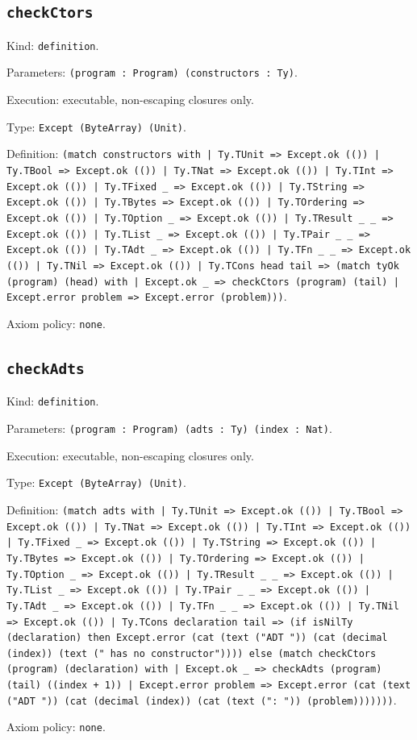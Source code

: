 \documentclass[11pt]{article}
\begin{document}
\subsection*{\texttt{checkCtors}}
\noindent Kind: \texttt{definition}.\par
\noindent Parameters: \texttt{(program : Program) (constructors : Ty)}.\par
\noindent Execution: executable, non-escaping closures only.\par
\noindent Type: \texttt{Except (ByteArray) (Unit)}.\par
\noindent Definition: \texttt{(match constructors with | Ty.TUnit => Except.ok (()) | Ty.TBool => Except.ok (()) | Ty.TNat => Except.ok (()) | Ty.TInt => Except.ok (()) | Ty.TFixed \_ => Except.ok (()) | Ty.TString => Except.ok (()) | Ty.TBytes => Except.ok (()) | Ty.TOrdering => Except.ok (()) | Ty.TOption \_ => Except.ok (()) | Ty.TResult \_ \_ => Except.ok (()) | Ty.TList \_ => Except.ok (()) | Ty.TPair \_ \_ => Except.ok (()) | Ty.TAdt \_ => Except.ok (()) | Ty.TFn \_ \_ => Except.ok (()) | Ty.TNil => Except.ok (()) | Ty.TCons head tail => (match tyOk (program) (head) with | Except.ok \_ => checkCtors (program) (tail) | Except.error problem => Except.error (problem)))}.\par
\noindent Axiom policy: \texttt{none}.\par
\subsection*{\texttt{checkAdts}}
\noindent Kind: \texttt{definition}.\par
\noindent Parameters: \texttt{(program : Program) (adts : Ty) (index : Nat)}.\par
\noindent Execution: executable, non-escaping closures only.\par
\noindent Type: \texttt{Except (ByteArray) (Unit)}.\par
\noindent Definition: \texttt{(match adts with | Ty.TUnit => Except.ok (()) | Ty.TBool => Except.ok (()) | Ty.TNat => Except.ok (()) | Ty.TInt => Except.ok (()) | Ty.TFixed \_ => Except.ok (()) | Ty.TString => Except.ok (()) | Ty.TBytes => Except.ok (()) | Ty.TOrdering => Except.ok (()) | Ty.TOption \_ => Except.ok (()) | Ty.TResult \_ \_ => Except.ok (()) | Ty.TList \_ => Except.ok (()) | Ty.TPair \_ \_ => Except.ok (()) | Ty.TAdt \_ => Except.ok (()) | Ty.TFn \_ \_ => Except.ok (()) | Ty.TNil => Except.ok (()) | Ty.TCons declaration tail => (if isNilTy (declaration) then Except.error (cat (text ("ADT ")) (cat (decimal (index)) (text (" has no constructor")))) else (match checkCtors (program) (declaration) with | Except.ok \_ => checkAdts (program) (tail) ((index + 1)) | Except.error problem => Except.error (cat (text ("ADT ")) (cat (decimal (index)) (cat (text (": ")) (problem)))))))}.\par
\noindent Axiom policy: \texttt{none}.\par
\end{document}
